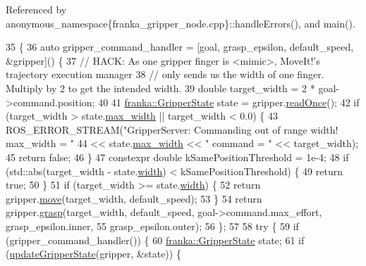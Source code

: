 Referenced by anonymous\+\_\+namespace\{franka\+\_\+gripper\+\_\+node.\+cpp\}\+::handle\+Errors(), and main().


\begin{DoxyCode}
35                                                         \{
36   \textcolor{keyword}{auto} gripper\_command\_handler = [goal, grasp\_epsilon, default\_speed, &gripper]() \{
37     \textcolor{comment}{// HACK: As one gripper finger is <mimic>, MoveIt!'s trajectory execution manager}
38     \textcolor{comment}{// only sends us the width of one finger. Multiply by 2 to get the intended width.}
39     \textcolor{keywordtype}{double} target\_width = 2 * goal->command.position;
40 
41     \hyperlink{structfranka_1_1GripperState}{franka::GripperState} state = gripper.\hyperlink{classfranka_1_1Gripper_ab0afc8a41c9c5fff808e76851dcf23ce}{readOnce}();
42     \textcolor{keywordflow}{if} (target\_width > state.\hyperlink{structfranka_1_1GripperState_ab71a26356c2898c49609bf991843e166}{max\_width} || target\_width < 0.0) \{
43       ROS\_ERROR\_STREAM(\textcolor{stringliteral}{"GripperServer: Commanding out of range width! max\_width = "}
44                        << state.\hyperlink{structfranka_1_1GripperState_ab71a26356c2898c49609bf991843e166}{max\_width} << \textcolor{stringliteral}{" command = "} << target\_width);
45       \textcolor{keywordflow}{return} \textcolor{keyword}{false};
46     \}
47     constexpr \textcolor{keywordtype}{double} kSamePositionThreshold = 1e-4;
48     \textcolor{keywordflow}{if} (std::abs(target\_width - state.\hyperlink{structfranka_1_1GripperState_adf095f446ec39a9a48e120b209dcd6e9}{width}) < kSamePositionThreshold) \{
49       \textcolor{keywordflow}{return} \textcolor{keyword}{true};
50     \}
51     \textcolor{keywordflow}{if} (target\_width >= state.\hyperlink{structfranka_1_1GripperState_adf095f446ec39a9a48e120b209dcd6e9}{width}) \{
52       \textcolor{keywordflow}{return} gripper.\hyperlink{classfranka_1_1Gripper_a047bc39267d66d6fb26c4c70669d68c2}{move}(target\_width, default\_speed);
53     \}
54     \textcolor{keywordflow}{return} gripper.\hyperlink{classfranka_1_1Gripper_abff6a03a6c75b9079bd4b9b5ca380254}{grasp}(target\_width, default\_speed, goal->command.max\_effort, grasp\_epsilon.inner,
55                          grasp\_epsilon.outer);
56   \};
57 
58   \textcolor{keywordflow}{try} \{
59     \textcolor{keywordflow}{if} (gripper\_command\_handler()) \{
60       \hyperlink{structfranka_1_1GripperState}{franka::GripperState} state;
61       \textcolor{keywordflow}{if} (\hyperlink{namespacefranka__gripper_a8d26c346602cc39ab2495f2fffc99d9c}{updateGripperState}(gripper, &state)) \{

\end{DoxyCode}
